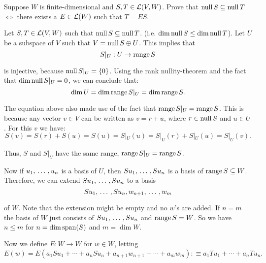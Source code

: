 \begin{xrcs}
  Suppose $W$ is finite-dimensional and $S, T \in \mathcal{L} (V,W)$. Prove that $\operatorname{null} S \subseteq \operatorname{null} T$ $\iff$ there exists a $E \in \mathcal{L} (W)$ such that $T=ES$.

  \begin{xprf}
    \Rightarrowdirection Let $S, T \in \mathcal{L} (V,W)$ such that $\operatorname{null} S \subseteq \operatorname{null} T$. (i.e. $\dim \operatorname{null} S \leq \dim \operatorname{null} T$). Let $U$ be a subspace of $V$ such that $V = \operatorname{null} S \oplus U$. This implies that
    \begin{equation}
      S|_U : U \to \operatorname{range} S
    \end{equation}

   is injective, because $\operatorname{null} S|_U = \{0\}$. Using the rank nullity-theorem and the fact that $\dim \operatorname{null} S|_U =0$, we can conclude that:
   \begin{equation}
     \dim U = \dim \operatorname{range} S|_U = \dim \operatorname{range} S.
   \end{equation}

   The equation above also made use of the fact that $\operatorname{range} S|_U = \operatorname{range} S$. This is because any vector $v \in V$ can be written as $v = r + u$, where $r \in \operatorname{null} S$ and $u \in U$. For this $v$ we have:
   \begin{equation}
     S(v) = S(r) + S(u) = S(u) = S|_U(u) = S|_U(r) + S|_U(u)= S|_U(v).
   \end{equation}

   Thus, $S$ and $S|_U$ have the same range, $\operatorname{range} S|_U = \operatorname{range} S$.

   Now if $u_1, {\, \ldots \,\,}, u_n$ is a basis of $U$, then $S u_1, {\, \ldots \,\,}, S u_n$ is a basis of $\operatorname{range} S \subseteq W$. Therefore, we can extend $S u_1, {\, \ldots \,\,}, S u_n$ to a basis
   \begin{equation}
     S u_1, {\, \ldots \,\,}, S u_n, w_{n+1}, {\, \ldots \,\,}, w_{m}
   \end{equation}

   of $W$. Note that the extension might be empty and no $w$'s are added. If $n = m$ the basis of $W$ just consists of $S u_1, {\, \ldots \,\,}, S u_n$ and $\operatorname{range} S = W$. So we have $n \leq m$ for $n = \dim \operatorname{span} (S)$ and $m = \dim W$.

   Now we define $E: W \to W$ for $w \in W$, letting
   \begin{equation}
     E(w) = E(a_1 Su_1 + \cdots + a_n Su_n + a_{n+1} w_{n+1} + \cdots + a_m w_m) :\equiv a_1 T u _1 + \cdots + a_n T u_n.
   \end{equation}


\end{xprf}
\end{xrcs}
